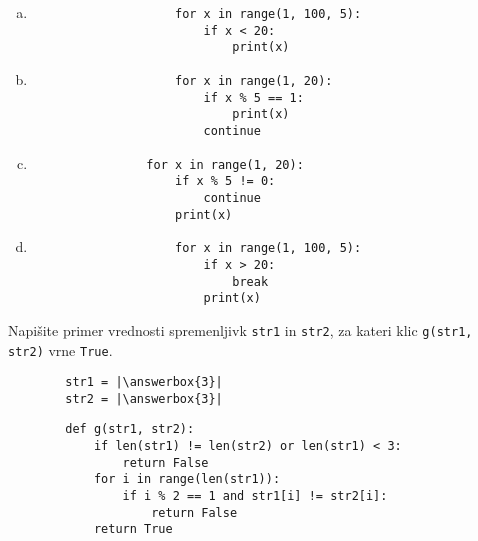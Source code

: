 \documentclass[arhiv, 10pt]{../izpit}
\newcommand{\inlinepy}[1]{\texttt{#1}}
\newcommand{\answerbox}[1]{\framebox{\vphantom{\large M}\hspace{#1cm}}}
\begin{document}
        \begin{multicols}{2}
        \begin{enumerate}[(a)]
\item 
                \begin{verbatim}
                    for x in range(1, 100, 5):
                        if x < 20:
                            print(x)
                \end{verbatim}
            
\item 
                \begin{verbatim}
                    for x in range(1, 20):
                        if x % 5 == 1:
                            print(x)
                        continue
                \end{verbatim}
            
\item 
            \begin{verbatim}
                for x in range(1, 20):
                    if x % 5 != 0:
                        continue
                    print(x)
            \end{verbatim}
        
\item 
                \begin{verbatim}
                    for x in range(1, 100, 5):
                        if x > 20:
                            break
                        print(x)
                \end{verbatim}
            
\end{enumerate}

        \end{multicols}
    
        \naloga*
        \begin{multicols}{2}
        \noindent
        Napišite primer vrednosti spremenljivk \inlinepy{str1} in \inlinepy{str2}, za kateri klic \inlinepy{g(str1, str2)} vrne \inlinepy{True}.
        \begin{verbatim}
        str1 = |\answerbox{3}|
        str2 = |\answerbox{3}|
        \end{verbatim}
        \vfil
        \columnbreak
        \begin{verbatim}
        def g(str1, str2):
            if len(str1) != len(str2) or len(str1) < 3:
                return False
            for i in range(len(str1)):
                if i % 2 == 1 and str1[i] != str2[i]:
                    return False
            return True
        \end{verbatim}
        \end{multicols}
    
\end{document}
